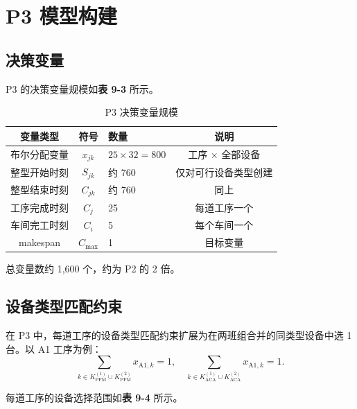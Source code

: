\documentclass[UTF8,a4paper,12pt]{ctexart}
\begin{document}
\section{P3 模型构建}
\subsection{决策变量}
P3 的决策变量规模如\textbf{表 9-3} 所示。

\begin{table}[htbp]
  \centering
  \caption{P3 决策变量规模}
  \label{tab:p3_var_scale}
  \begin{tabular}{cclc}
    \toprule
    变量类型 & 符号 & 数量 & 说明 \\
    \midrule
    布尔分配变量 & $x_{jk}$ & $25 \times 32 = 800$ & 工序 × 全部设备 \\
    整型开始时刻 & $S_{jk}$ & 约 760 & 仅对可行设备类型创建 \\
    整型结束时刻 & $C_{jk}$ & 约 760 & 同上 \\
    工序完成时刻 & $C_j$ & 25 & 每道工序一个 \\
    车间完工时刻 & $C_i$ & 5 & 每个车间一个 \\
    makespan & $C_{\max}$ & 1 & 目标变量 \\
    \bottomrule
  \end{tabular}
\end{table}

总变量数约 1,600 个，约为 P2 的 2 倍。

\subsection{设备类型匹配约束}
在 P3 中，每道工序的设备类型匹配约束扩展为在两班组合并的同类型设备中选 1 台。以 A1 工序为例：
\begin{equation}
\sum_{k \in K_{\text{PFM}}^{(1)} \cup K_{\text{PFM}}^{(2)}} x_{\text{A1},k} = 1, \quad \sum_{k \in K_{\text{ACA}}^{(1)} \cup K_{\text{ACA}}^{(2)}} x_{\text{A1},k} = 1. \tag{9-2}
\end{equation}

每道工序的设备选择范围如\textbf{表 9-4} 所示。
\end{document}
